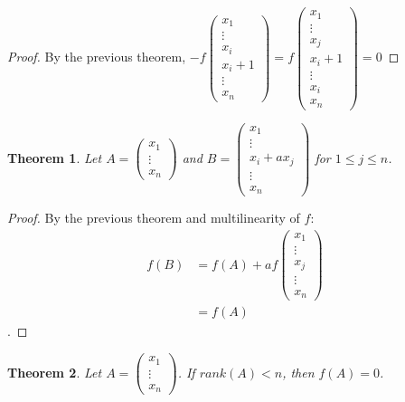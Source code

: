 \documentclass{article}
\newtheorem{thm}{Theorem}
\begin{document}
\begin{proof}
By the previous theorem, $-f\begin{pmatrix}x_1 \\ \vdots \\ x_i \\ x_i+1 \\ \vdots \\ x_n \end{pmatrix}=f\begin{pmatrix}x_1 \\ \vdots \\ x_j \\ x_i+1 \\ \vdots \\ x_i \\ x_n \end{pmatrix}=0$	
\end{proof}
\begin{thm}
Let $A=\begin{pmatrix}x_1 \\ \vdots \\ x_n	\end{pmatrix}$ and $B=\begin{pmatrix}x_1 \\ \vdots \\ x_i+ax_j \\ \vdots \\ x_n \end{pmatrix}$
for $1 \leq j \leq n$.
	
\end{thm}
\begin{proof}
By the previous theorem and multilinearity of $f$:
\begin{align}
f(B)&= f(A)+af\begin{pmatrix}x_1 \\ \vdots \\ x_j \\ \vdots \\ x_n\end{pmatrix} \\ 
&=f(A)
\end{align}.
\end{proof}
\begin{thm}
Let $A=\begin{pmatrix}x_1 \\ \vdots \\ x_n\end{pmatrix}$. If $rank(A)<n$, then $f(A)=0$.
	
\end{thm}
\end{document}
